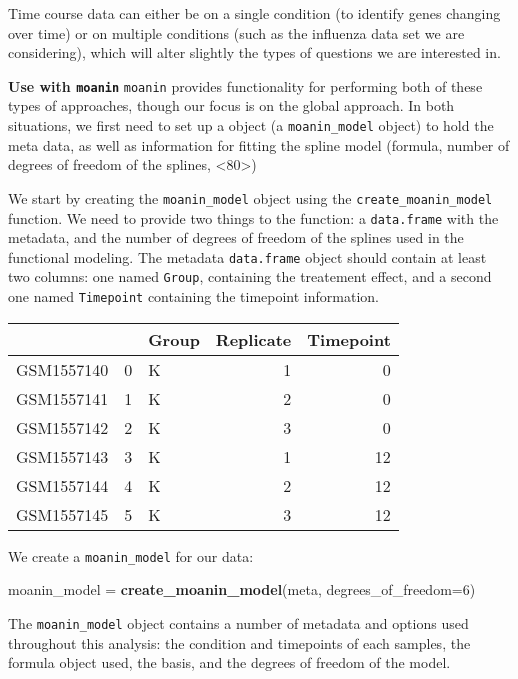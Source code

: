 \documentclass[9pt,a4paper,]{extarticle}
\newenvironment{Shaded}{\begin{snugshade}}{\end{snugshade}}
\newcommand{\DataTypeTok}[1]{\textcolor[rgb]{0.13,0.29,0.53}{#1}}
\newcommand{\DecValTok}[1]{\textcolor[rgb]{0.00,0.00,0.81}{#1}}
\newcommand{\KeywordTok}[1]{\textcolor[rgb]{0.13,0.29,0.53}{\textbf{#1}}}
\newcommand{\NormalTok}[1]{#1}
\newcommand{\StringTok}[1]{\textcolor[rgb]{0.31,0.60,0.02}{#1}}
\begin{document}
Time course data can either be on a single condition (to identify genes
changing over time) or on multiple conditions (such as the influenza
data set we are considering), which will alter slightly the types of questions
we are interested in.

\textbf{Use with \texttt{moanin}} \texttt{moanin} provides functionality for performing both of
these types of approaches, though our focus is on the global approach. In both
situations, we first need to set up a object (a \texttt{moanin\_model} object) to
hold the meta data, as well as information for fitting the spline model
(formula, number of degrees of freedom of the splines, \textless{}80\textgreater{})

We start by creating the \texttt{moanin\_model} object using the \texttt{create\_moanin\_model}
function. We need to provide two things to the function: a \texttt{data.frame} with
the metadata, and the number of degrees of freedom of the splines used in the
functional modeling. The metadata \texttt{data.frame} object should contain at least
two columns: one named \texttt{Group}, containing the treatement effect, and a
second one named \texttt{Timepoint} containing the timepoint information.

\begin{tabular}{l|r|l|r|r}
\hline
  &  & Group & Replicate & Timepoint\\
\hline
GSM1557140 & 0 & K & 1 & 0\\
\hline
GSM1557141 & 1 & K & 2 & 0\\
\hline
GSM1557142 & 2 & K & 3 & 0\\
\hline
GSM1557143 & 3 & K & 1 & 12\\
\hline
GSM1557144 & 4 & K & 2 & 12\\
\hline
GSM1557145 & 5 & K & 3 & 12\\
\hline
\end{tabular}

We create a \texttt{moanin\_model} for our data:

\begin{Shaded}
\begin{Highlighting}[]
\NormalTok{moanin_model =}\StringTok{ }\KeywordTok{create_moanin_model}\NormalTok{(meta, }\DataTypeTok{degrees_of_freedom=}\DecValTok{6}\NormalTok{)}
\end{Highlighting}
\end{Shaded}

The \texttt{moanin\_model} object contains a number of metadata and options used
throughout this analysis: the condition and timepoints of each samples, the
formula object used, the basis, and the degrees of freedom of the model.
\end{document}
